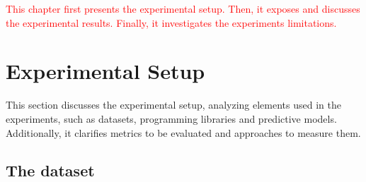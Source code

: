 
%


\textcolor{red}{
This chapter first presents the experimental setup. Then, it exposes and discusses the experimental results. Finally, it investigates the experiments limitations. 
}

\section{Experimental Setup}

This section discusses the experimental setup, analyzing elements used in the experiments, such as datasets, programming libraries and predictive models. Additionally, it clarifies metrics to be evaluated and approaches to measure them.  

\subsection{The dataset}


